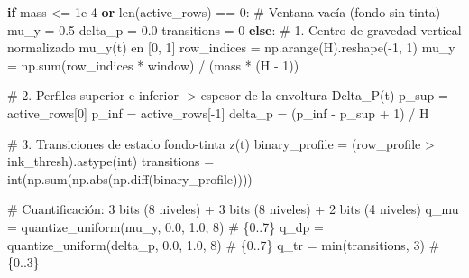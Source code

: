 \documentclass[
  spanish,
  us-letterpaper,
]{scrreprt}
\newenvironment{Shaded}{\begin{snugshade}}{\end{snugshade}}
\newcommand{\BuiltInTok}[1]{\textcolor[rgb]{0.00,0.23,0.31}{#1}}
\newcommand{\CommentTok}[1]{\textcolor[rgb]{0.37,0.37,0.37}{#1}}
\newcommand{\ControlFlowTok}[1]{\textcolor[rgb]{0.00,0.23,0.31}{\textbf{#1}}}
\newcommand{\DecValTok}[1]{\textcolor[rgb]{0.68,0.00,0.00}{#1}}
\newcommand{\FloatTok}[1]{\textcolor[rgb]{0.68,0.00,0.00}{#1}}
\newcommand{\KeywordTok}[1]{\textcolor[rgb]{0.00,0.23,0.31}{\textbf{#1}}}
\newcommand{\NormalTok}[1]{\textcolor[rgb]{0.00,0.23,0.31}{#1}}
\newcommand{\OperatorTok}[1]{\textcolor[rgb]{0.37,0.37,0.37}{#1}}
\theoremstyle{definition}
\theoremstyle{remark}
\begin{document}
\begin{Shaded}
\begin{Highlighting}[]
        \ControlFlowTok{if}\NormalTok{ mass }\OperatorTok{\textless{}=} \FloatTok{1e{-}4} \KeywordTok{or} \BuiltInTok{len}\NormalTok{(active\_rows) }\OperatorTok{==} \DecValTok{0}\NormalTok{:}
            \CommentTok{\# Ventana vacía (fondo sin tinta)}
\NormalTok{            mu\_y }\OperatorTok{=} \FloatTok{0.5}
\NormalTok{            delta\_p }\OperatorTok{=} \FloatTok{0.0}
\NormalTok{            transitions }\OperatorTok{=} \DecValTok{0}
        \ControlFlowTok{else}\NormalTok{:}
            \CommentTok{\# 1. Centro de gravedad vertical normalizado mu\_y(t) en [0, 1]}
\NormalTok{            row\_indices }\OperatorTok{=}\NormalTok{ np.arange(H).reshape(}\OperatorTok{{-}}\DecValTok{1}\NormalTok{, }\DecValTok{1}\NormalTok{)}
\NormalTok{            mu\_y }\OperatorTok{=}\NormalTok{ np.}\BuiltInTok{sum}\NormalTok{(row\_indices }\OperatorTok{*}\NormalTok{ window) }\OperatorTok{/}\NormalTok{ (mass }\OperatorTok{*}\NormalTok{ (H }\OperatorTok{{-}} \DecValTok{1}\NormalTok{))}

            \CommentTok{\# 2. Perfiles superior e inferior {-}\textgreater{} espesor de la envoltura Delta\_P(t)}
\NormalTok{            p\_sup }\OperatorTok{=}\NormalTok{ active\_rows[}\DecValTok{0}\NormalTok{]}
\NormalTok{            p\_inf }\OperatorTok{=}\NormalTok{ active\_rows[}\OperatorTok{{-}}\DecValTok{1}\NormalTok{]}
\NormalTok{            delta\_p }\OperatorTok{=}\NormalTok{ (p\_inf }\OperatorTok{{-}}\NormalTok{ p\_sup }\OperatorTok{+} \DecValTok{1}\NormalTok{) }\OperatorTok{/}\NormalTok{ H}

            \CommentTok{\# 3. Transiciones de estado fondo{-}tinta z(t)}
\NormalTok{            binary\_profile }\OperatorTok{=}\NormalTok{ (row\_profile }\OperatorTok{\textgreater{}}\NormalTok{ ink\_thresh).astype(}\BuiltInTok{int}\NormalTok{)}
\NormalTok{            transitions }\OperatorTok{=} \BuiltInTok{int}\NormalTok{(np.}\BuiltInTok{sum}\NormalTok{(np.}\BuiltInTok{abs}\NormalTok{(np.diff(binary\_profile))))}

        \CommentTok{\# Cuantificación: 3 bits (8 niveles) + 3 bits (8 niveles) + 2 bits (4 niveles)}
\NormalTok{        q\_mu }\OperatorTok{=}\NormalTok{ quantize\_uniform(mu\_y, }\FloatTok{0.0}\NormalTok{, }\FloatTok{1.0}\NormalTok{, }\DecValTok{8}\NormalTok{)          }\CommentTok{\# \{0..7\}}
\NormalTok{        q\_dp }\OperatorTok{=}\NormalTok{ quantize\_uniform(delta\_p, }\FloatTok{0.0}\NormalTok{, }\FloatTok{1.0}\NormalTok{, }\DecValTok{8}\NormalTok{)       }\CommentTok{\# \{0..7\}}
\NormalTok{        q\_tr }\OperatorTok{=} \BuiltInTok{min}\NormalTok{(transitions, }\DecValTok{3}\NormalTok{)                          }\CommentTok{\# \{0..3\}}


\end{Highlighting}
\end{Shaded}
\end{document}
